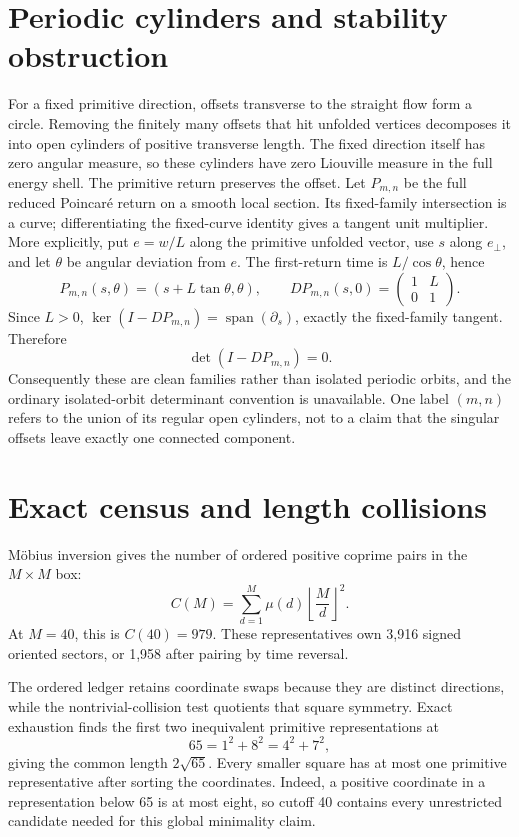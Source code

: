 \documentclass[10pt]{article}
\begin{document}
\section{Periodic cylinders and stability obstruction}
For a fixed primitive direction, offsets transverse to the straight flow form
a circle.  Removing the finitely many offsets that hit unfolded vertices
decomposes it into open cylinders of positive transverse length.  The fixed
direction itself has zero angular measure, so these cylinders have zero
Liouville measure in the full energy shell.  The primitive return preserves
the offset.  Let $P_{m,n}$ be the full reduced Poincar\'e return on a smooth
local section.  Its fixed-family intersection is a curve; differentiating the
fixed-curve identity gives a tangent unit multiplier.  More explicitly, put
$e=w/L$ along the primitive unfolded vector, use $s$ along $e_\perp$, and let
$\theta$ be angular deviation from $e$.  The first-return time is
$L/\cos\theta$, hence
\[
P_{m,n}(s,\theta)=(s+L\tan\theta,\theta),\qquad
DP_{m,n}(s,0)=\begin{pmatrix}1&L\\0&1\end{pmatrix}.
\]
Since $L>0$, $\ker(I-DP_{m,n})=\operatorname{span}(\partial_s)$, exactly the
fixed-family tangent.  Therefore
\begin{equation}
\det(I-DP_{m,n})=0.                              \tag{2}
\end{equation}
Consequently these are clean families rather than isolated periodic orbits,
and the ordinary isolated-orbit determinant convention is unavailable.  One
label $(m,n)$ refers to the union of its regular open cylinders, not to a claim
that the singular offsets leave exactly one connected component.

\section{Exact census and length collisions}
M\"obius inversion gives the number of ordered positive coprime pairs in the
$M\times M$ box:
\begin{equation}
C(M)=\sum_{d=1}^{M}\mu(d)\left\lfloor\frac Md\right\rfloor^2. \tag{3}
\end{equation}
At $M=40$, this is $C(40)=979$.  These representatives own 3,916 signed
oriented sectors, or 1,958 after pairing by time reversal.

The ordered ledger retains coordinate swaps because they are distinct
directions, while the nontrivial-collision test quotients that square symmetry.
Exact exhaustion finds the first two inequivalent primitive representations at
\begin{equation}
65=1^2+8^2=4^2+7^2,                              \tag{4}
\end{equation}
giving the common length $2\sqrt{65}$.  Every smaller square has at most one
primitive representative after sorting the coordinates.  Indeed, a positive
coordinate in a representation below 65 is at most eight, so cutoff 40
contains every unrestricted candidate needed for this global minimality claim.
\end{document}

